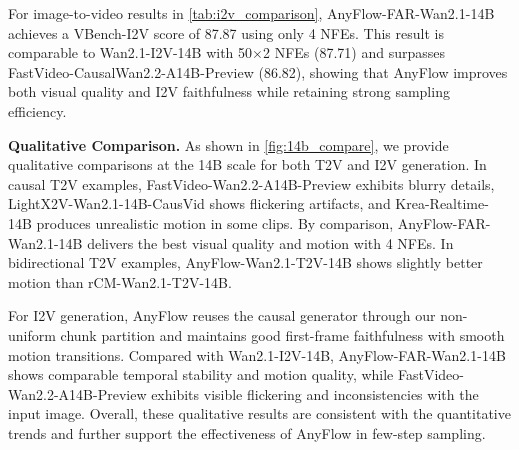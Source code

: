 \documentclass{llmxive}
\providecommand{\myPara}[1]{\noindent\textbf{#1}}
\begin{document}
For image-to-video results in \cref{tab:i2v_comparison}, AnyFlow-FAR-Wan2.1-14B achieves a VBench-I2V score of 87.87 using only 4 NFEs. This result is comparable to Wan2.1-I2V-14B with 50$\times$2 NFEs (87.71) and surpasses FastVideo-CausalWan2.2-A14B-Preview (86.82), showing that AnyFlow improves both visual quality and I2V faithfulness while retaining strong sampling efficiency.

\myPara{Qualitative Comparison.}
As shown in \cref{fig:14b_compare}, we provide qualitative comparisons at the 14B scale for both T2V and I2V generation. In causal T2V examples, FastVideo-Wan2.2-A14B-Preview exhibits blurry details, LightX2V-Wan2.1-14B-CausVid shows flickering artifacts, and Krea-Realtime-14B produces unrealistic motion in some clips. By comparison, AnyFlow-FAR-Wan2.1-14B delivers the best visual quality and motion with 4 NFEs. In bidirectional T2V examples, AnyFlow-Wan2.1-T2V-14B shows slightly better motion than rCM-Wan2.1-T2V-14B.

For I2V generation, AnyFlow reuses the causal generator through our non-uniform chunk partition and maintains good first-frame faithfulness with smooth motion transitions. Compared with Wan2.1-I2V-14B, AnyFlow-FAR-Wan2.1-14B shows comparable temporal stability and motion quality, while FastVideo-Wan2.2-A14B-Preview exhibits visible flickering and inconsistencies with the input image. Overall, these qualitative results are consistent with the quantitative trends and further support the effectiveness of AnyFlow in few-step sampling.
\end{document}
